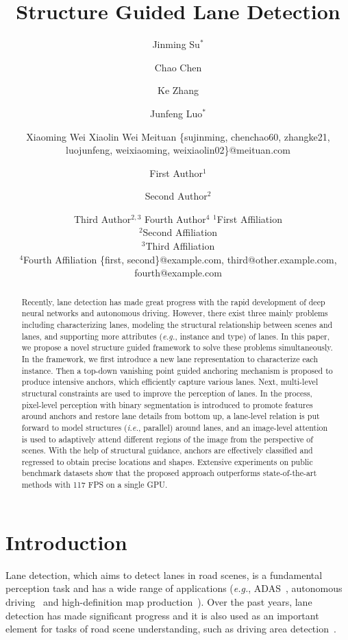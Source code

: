 \documentclass{article}
\title{Structure Guided Lane Detection}
\author{
Jinming Su$^*$ \and
Chao Chen \and
Ke Zhang \and
Junfeng Luo$^*$ \and
Xiaoming Wei \And
Xiaolin Wei
\affiliations
Meituan
\emails
\{sujinming, chenchao60, zhangke21, luojunfeng, weixiaoming, weixiaolin02\}@meituan.com
}
\author{
First Author$^1$
\and
Second Author$^2$\and
Third Author$^{2,3}$\And
Fourth Author$^4$
\affiliations
$^1$First Affiliation\\
$^2$Second Affiliation\\
$^3$Third Affiliation\\
$^4$Fourth Affiliation
\emails
\{first, second\}@example.com,
third@other.example.com,
fourth@example.com
}
\def\ie{\emph{i.e.}}
\def\eg{\emph{e.g.}}
\begin{document}
\maketitle

\begin{abstract}
Recently, lane detection has made great progress with the rapid development of deep neural networks and autonomous driving. 
However, there exist three mainly problems including characterizing lanes, modeling the structural relationship between scenes and lanes, and supporting more attributes (\eg, instance and type) of lanes.
In this paper, we propose a novel structure guided framework to solve these problems simultaneously. In the framework, we first introduce a new lane representation to characterize each instance. Then a top-down vanishing point guided anchoring mechanism is proposed to produce intensive anchors, which efficiently capture various lanes. 
Next, multi-level structural constraints are used to improve the perception of lanes. In the process, pixel-level perception with binary segmentation is introduced to promote features around anchors and restore  lane details from bottom up, a lane-level relation is put forward to model structures (\ie, parallel)  around lanes, and an image-level attention is used to adaptively attend different regions of the image from the perspective of scenes. With the help of structural guidance, anchors are effectively classified and regressed to obtain precise locations and shapes.
Extensive experiments on public benchmark datasets show that the proposed approach outperforms state-of-the-art methods with 117 FPS on a single GPU.
\end{abstract}
\let\thefootnote\relax{}

\section{Introduction}
Lane detection, which aims to detect lanes in road scenes, is a fundamental perception task and has a wide range of applications (\eg, ADAS~\cite{butakov2014personalized}, autonomous driving~\cite{chen2017end} and high-definition map production~\cite{homayounfar2019dagmapper}). Over the past years, lane detection has made significant progress and it is also used as an important element for tasks of road scene understanding, such as driving area detection~\cite{yu2020bdd100k}. 
\end{document}
